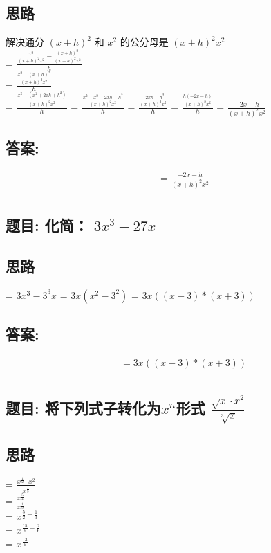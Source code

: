 \documentclass[12pt]{article}
\begin{document}
\subsection*{思路}
解决通分
$(x+h)^{2}$ 和 $x^{2}$ 的公分母是 $(x+h)^{2}x^{2}$\\
= $\frac{\frac{x^{2}}{(x+h)^{2}x^{2}} - \frac{(x+h)^{2}}{(x+h)^{2}x^{2}}}{h}$\\
= $\frac{\frac{x^{2} - (x+h)^{2}}{(x+h)^{2}x^{2}}}{h}$\\
= $\frac{\frac{x^{2}-(x^{2} + 2xh + h^{2})}{(x+h)^{2}x^{2}}}{h}$
= $\frac{\frac{x^{2}-x^{2} - 2xh - h^{2}}{(x+h)^{2}x^{2}}}{h}$
= $\frac{\frac{-2xh - h^{2}}{(x+h)^{2}x^{2}}}{h}$
= $\frac{\frac{h(-2x - h)}{(x+h)^{2}x^{2}}}{h}$
= $\frac{-2x - h}{(x+h)^{2}x^{2}}$
\subsection*{答案:}
\begin{align*}
  &= \frac{-2x - h}{(x+h)^{2}x^{2}} \\
\end{align*}

\subsection*{题目: 化简： $3x^{3}-27x$}
\subsection*{思路} 
= $3x^{3} - 3^3x$ 
= $3x(x^{2} - 3^{2})$
= $3x((x-3)*(x+3))$
\subsection*{答案:}
\begin{align*}
  &= 3x((x-3)*(x+3)) \\
\end{align*}

\subsection*{题目: 将下列式子转化为$x^{n}$形式  $\frac{\sqrt{x} \cdot x^{2}}{\sqrt[3]{x}}$}
\subsection*{思路} 
= $\frac{x^{\frac{1}{2}} \cdot x^{2}}{x^{\frac{1}{3}}}$\\
= $\frac{x^{\frac{5}{2}}}{x^{\frac{1}{3}}}$\\
= $x^{\frac{5}{2}-\frac{1}{3}}$\\
= $x^{\frac{15}{6}-\frac{2}{6}}$\\
= $x^{\frac{13}{6}}$\\
\end{document}
